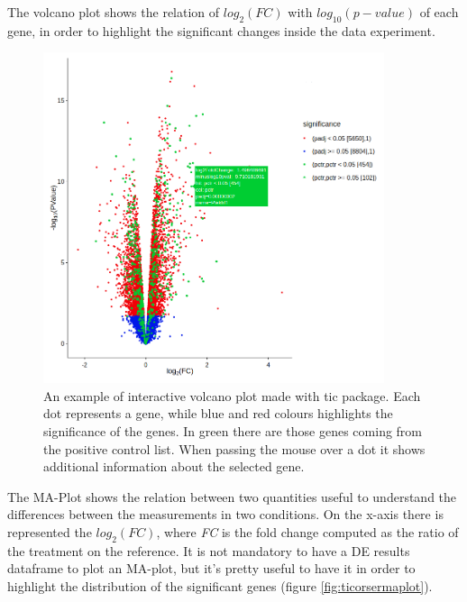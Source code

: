 The volcano plot shows the relation of $log_2(FC)$ with $log_{10}(p-value)$ of each gene, in order to highlight the significant changes inside the data experiment.

\begin{figure}[H]
\centering
\includegraphics[width=10cm, keepaspectratio]{img/ticorser/volcano_example.png}
\caption[ticorser volcano]{An example of interactive volcano plot made with \gls{tic} package. Each dot represents a gene, while blue and red colours highlights the significance of the genes. In green there are those genes coming from the positive control list. When passing the mouse over a dot it shows additional information about the selected gene.}
\label{fig:ticorservolcano}
\end{figure}

The MA-Plot shows the relation between two quantities useful to understand the differences between the measurements in two conditions.
On the x-axis there is represented the $log_2(FC)$, where \textit{FC} is the fold change computed as the ratio of the treatment on the reference.
It is not mandatory to have a DE results dataframe to plot an MA-plot, but it's pretty useful to have it in order to highlight the distribution of the significant genes (figure \ref{fig:ticorsermaplot}).
 
